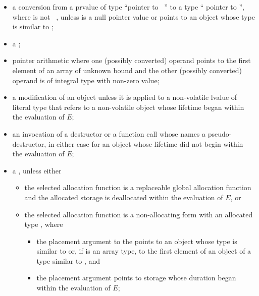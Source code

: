 \begin{itemize}
\begin{note}
\begin{example}
\begin{codeblock}
// OK to capture objects with automatic storage duration created during constant expression evaluation.
static_assert(bind(monad(2))(monad)() == monad(2)());
\end{codeblock}
\end{example}
\end{note}

\item
a conversion
from a prvalue  of type ``pointer to \cv{}~''
to a type `` pointer to  '',
where   is not ~,
unless 
is a null pointer value or
points to an object whose type is similar to ;

\item
a ;

\item
pointer arithmetic where
one (possibly converted) operand
points to the first element of an array of unknown bound and
the other (possibly converted) operand
is of integral type with non-zero value;

\item
a modification of an object
unless it is applied to a non-volatile lvalue of literal type
that refers to a non-volatile object
whose lifetime began within the evaluation of $E$;

\item
an invocation of a destructor or a function call
whose  names a pseudo-destructor,
in either case for an object whose lifetime did not begin within the evaluation of $E$;

\item
a ,
unless either
\begin{itemize}
\item
the selected allocation function is
a replaceable global allocation function and
the allocated storage is deallocated within the evaluation of $E$, or
\item
the selected allocation function is
a non-allocating form
with an allocated type , where
\begin{itemize}
\item
the placement argument to the  points to
an object whose type is similar to  or,
if  is an array type,
to the first element of an object of a type similar to , and
\item
the placement argument points to storage
whose duration began within the evaluation of $E$;
\end{itemize}
\end{itemize}


\end{itemize}
